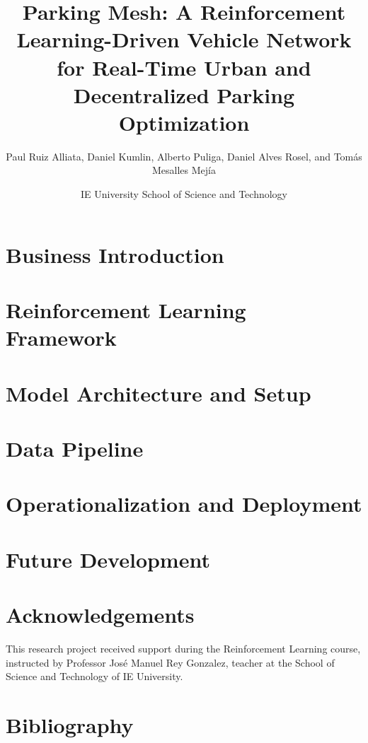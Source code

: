 \documentclass[twocolumn]{NobArticle}
\title{Parking Mesh: A Reinforcement Learning-Driven Vehicle Network for Real-Time Urban and Decentralized Parking Optimization}
\author{
    Paul Ruiz Alliata, 
    Daniel Kumlin,
    Alberto Puliga,
    Daniel Alves Rosel, 
    and Tomás Mesalles Mejía
}
\date{
    IE University School of Science and Technology
}
\begin{document}
\small
\maketitle

\section{Business Introduction}


 
  
        

\section{Reinforcement Learning Framework}
 


\section{Model Architecture and Setup}


                                          

\section{Data Pipeline}


\section{Operationalization and Deployment}





\section{Future Development}


\section*{Acknowledgements}
This research project received support during the Reinforcement Learning course, instructed by Professor José Manuel Rey Gonzalez, teacher at the School of Science and Technology of IE University.

\section{Bibliography}
\printbibliography
\end{document}
